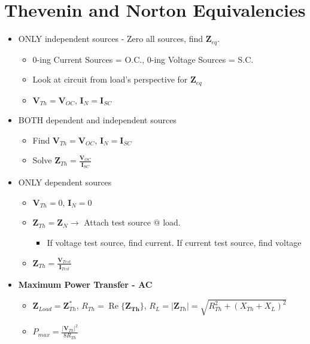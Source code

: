 \documentclass[10pt,letterpaper,final,twoside,notitlepage]{article}
\renewcommand{\Re}{\operatorname{Re}} %
\begin{document}
\section*{Thevenin and Norton Equivalencies} \label{sec:Thevenin/Norton}
	\begin{itemize}[noitemsep, nolistsep]
		\item ONLY independent sources - Zero all sources, find $\mathbf{Z}_{eq}$.
		\begin{itemize}[noitemsep, nolistsep]
			\item 0-ing Current Sources = O.C., 0-ing Voltage Sources = S.C.
			\item Look at circuit from load's perspective for $\mathbf{Z}_{eq}$
			\item $\mathbf{V}_{Th}=\mathbf{V}_{OC}$, $\mathbf{I}_{N} = \mathbf{I}_{SC}$
		\end{itemize}
		\item BOTH dependent and independent sources
			\begin{itemize}[noitemsep, nolistsep]
				\item Find $\mathbf{V}_{Th}=\mathbf{V}_{OC}$, $\mathbf{I}_{N}=\mathbf{I}_{SC}$
				\item Solve $\mathbf{Z}_{Th}=\frac{\mathbf{V}_{OC}}{\mathbf{I}_{SC}}$
			\end{itemize}
		\item ONLY dependent sources
			\begin{itemize}[noitemsep, nolistsep]
				\item $\mathbf{V}_{Th}=0$, $\mathbf{I}_{N}=0$
				\item $\mathbf{Z}_{Th}=\mathbf{Z}_{N} \rightarrow$ Attach test source @ load.
				\begin{itemize}
					\item If voltage test source, find current. If current test source, find voltage
				\end{itemize}
				\item $\mathbf{Z}_{Th}=\frac{\mathbf{V}_{Test}}{\mathbf{I}_{Test}}$
			\end{itemize}
		\item \textbf{Maximum Power Transfer - AC}
			\begin{itemize}[noitemsep, nolistsep]
				\item $\mathbf{Z}_{Load}=\mathbf{Z}_{Th}^*$, $R_{Th}=\Re\lbrace\mathbf{Z_{Th}}\rbrace$, $R_L= \lvert \mathbf{Z}_{Th} \rvert = \sqrt{R_{Th}^2+\left( X_{Th}+X_{L}\right)^2}$
				\item $P_{max}=\frac{\lvert\mathbf{V}_{Th}\rvert^2}{8R_{Th}}$
			\end{itemize}
	\end{itemize}
\end{document}
